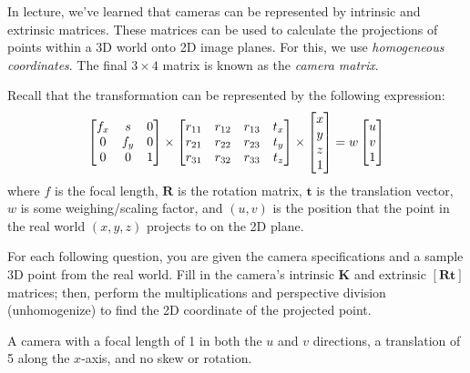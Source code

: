 \documentclass{csci1430}
\begin{document}
\pagebreak
\begin{question}[points=8,drawbox=false]
In lecture, we've learned that cameras can be represented by intrinsic and extrinsic matrices. These matrices can be used to calculate the projections of points within a 3D world onto 2D image planes. For this, we use \emph{homogeneous coordinates}. The final $3\times4$ matrix is known as the \emph{camera matrix}.

Recall that the transformation can be represented by the following expression:
\begin{align*}
    \begin{bmatrix} 
    f_x & s & $0$ \\ 
    $0$ & f_y & $0$ \\ 
    $0$ & $0$ & $1$ \end{bmatrix} \times
    \begin{bmatrix} 
    r_{11} & r_{12} & r_{13} & t_x \\ 
    r_{21} & r_{22} & r_{23} & t_y \\  
    r_{31} & r_{32} & r_{33} & t_z
    \end{bmatrix} \times 
    \begin{bmatrix} 
    x \\ 
    y \\ 
    z \\ 
    $1$ \end{bmatrix}
    = w
    \begin{bmatrix}  u \\ v \\ $1$ \end{bmatrix}
\end{align*}
where $f$ is the focal length, $\mathbf{R}$ is the rotation matrix, $\mathbf{t}$ is the translation vector,  $w$ is some weighing/scaling factor, and $(u, v)$ is the position that the point in the real world $(x, y, z)$ projects to on the 2D plane.

For each following question, you are given the camera specifications and a sample 3D point from the real world. Fill in the camera's intrinsic $\mathbf{K}$ and extrinsic $\mathbf{[Rt]}$ matrices; then, perform the multiplications and perspective division (unhomogenize) to find the 2D coordinate of the projected point.
\end{question}

\begin{subsubquestion}[points=1]
A camera with a focal length of 1 in both the $u$ and $v$ directions, a translation of 5 along the $x$-axis, and no skew or rotation.
\end{subsubquestion}
\end{document}
